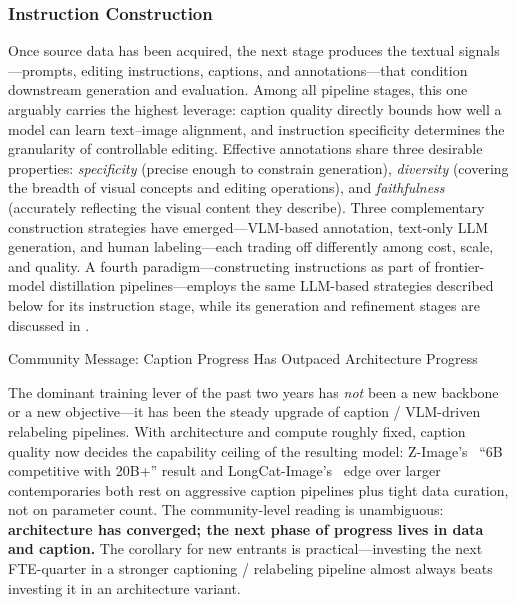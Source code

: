 \subsubsection{Instruction Construction}\label{sec:instruction}

Once source data has been acquired, the next stage produces the textual signals---prompts, editing instructions, captions, and annotations---that condition downstream generation and evaluation. Among all pipeline stages, this one arguably carries the highest leverage: caption quality directly bounds how well a model can learn text--image alignment, and instruction specificity determines the granularity of controllable editing. Effective annotations share three desirable properties: \emph{specificity} (precise enough to constrain generation), \emph{diversity} (covering the breadth of visual concepts and editing operations), and \emph{faithfulness} (accurately reflecting the visual content they describe). Three complementary construction strategies have emerged---VLM-based annotation, text-only LLM generation, and human labeling---each trading off differently among cost, scale, and quality. A fourth paradigm---constructing instructions as part of frontier-model distillation pipelines---employs the same LLM-based strategies described below for its instruction stage, while its generation and refinement stages are discussed in .

\begin{highlightbox}{Community Message: Caption Progress Has Outpaced Architecture Progress}

The dominant training lever of the past two years has \emph{not} been a new backbone or a new objective---it has been the steady upgrade of caption / VLM-driven relabeling pipelines. With architecture and compute roughly fixed, caption quality now decides the capability ceiling of the resulting model: Z-Image's~\citep{cai2025z} ``6B competitive with 20B+'' result and LongCat-Image's~\citep{team2025longcat} edge over larger contemporaries both rest on aggressive caption pipelines plus tight data curation, not on parameter count. The community-level reading is unambiguous: \textbf{architecture has converged; the next phase of progress lives in data and caption.} The corollary for new entrants is practical---investing the next FTE-quarter in a stronger captioning / relabeling pipeline almost always beats investing it in an architecture variant.
\end{highlightbox}

